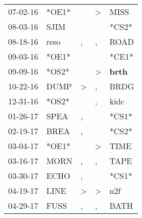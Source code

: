\begin{supertabular}{p{0.07\textwidth}p{0.06\textwidth}p{0.02\textwidth}p{0.02\textwidth}p{0.06\textwidth}}
          07-02-16\textsuperscript{} &                            *OE1* &                  &     \textgreater &           MISS\textsuperscript{} \\
          08-03-16\textsuperscript{} &           SJIM\textsuperscript{} &                  &                  &                            *CS2* \\
          08-18-16\textsuperscript{} &           reso\textsuperscript{} &                , &                , &           ROAD\textsuperscript{} \\
          09-03-16\textsuperscript{} &                            *OE1* &                  &                  &                            *CE1* \\
          09-09-16\textsuperscript{} &                            *OS2* &                  &     \textgreater &  \textbf{brth\textsuperscript{}} \\
          10-22-16\textsuperscript{} &           DUMP\textsuperscript{} &     \textgreater &                , &           BRDG\textsuperscript{} \\
          12-31-16\textsuperscript{} &                            *OS2* &                  &                , &           kidc\textsuperscript{} \\
          01-26-17\textsuperscript{} &           SPEA\textsuperscript{} &                , &                  &                            *CS1* \\
          02-19-17\textsuperscript{} &           BREA\textsuperscript{} &                , &                  &                            *CS2* \\
          03-04-17\textsuperscript{} &                            *OE1* &                  &     \textgreater &           TIME\textsuperscript{} \\
          03-16-17\textsuperscript{} &           MORN\textsuperscript{} &                , &                , &           TAPE\textsuperscript{} \\
          03-30-17\textsuperscript{} &           ECHO\textsuperscript{} &                , &                  &                            *CS1* \\
          04-19-17\textsuperscript{} &           LINE\textsuperscript{} &     \textgreater &     \textgreater &            n2f\textsuperscript{} \\
          04-29-17\textsuperscript{} &           FUSS\textsuperscript{} &                , &                , &           BATH\textsuperscript{} \\

\end{supertabular}
